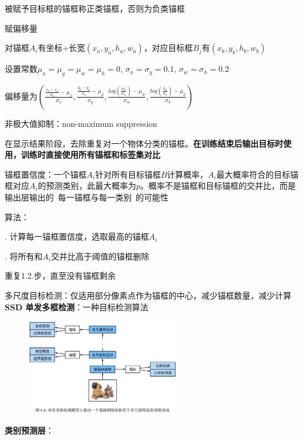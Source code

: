 \documentclass[UTF8]{ctexart}
\begin{document}
  \quad \quad 被赋予目标框的锚框称正类锚框，否则为负类锚框

  \quad 赋偏移量

  \quad \quad 对锚框$A_i$有坐标+长宽$(x_a, y_a, h_a, w_a)$，对应目标框$B_j$有$(x_b, y_b, h_b, w_b)$

  \quad \quad 设置常数$\mu_x = \mu_y = \mu_w = \mu_h = 0$, $\sigma_x = \sigma_y = 0.1$, $\sigma_w = \sigma_h = 0.2$

  \quad \quad 偏移量为$(\frac{\frac{x_b - x_a}{w_a} - \mu_x}{\sigma_x},\frac{\frac{y_b - y_a}{h_a} - \mu_y}{\sigma_y}, \frac{log(\frac{w_b}{w_a}) - \mu_w}{\sigma_w}, \frac{log(\frac{h_b}{h_a}) - \mu_h}{\sigma_h})$

  非极大值抑制：non-maximum suppression

  \quad 在显示结果阶段，去除重复对一个物体分类的锚框。\textbf{在训练结束后输出目标时使用，训练时直接使用所有锚框和标签集对比}

  \quad 锚框置信度：一个锚框$A_i$针对所有目标锚框$B$计算概率，$A_i$最大概率符合的目标锚框对应$A_i$的预测类别，此最大概率为$p$。概率不是锚框和目标锚框的交并比，而是输出层输出的\ 每一锚框与每一类别\ 的可能性

  \quad 算法：

  \quad {}. 计算每一锚框置信度，选取最高的锚框$A_i$

  \quad {}. 将所有和$A_i$交并比高于阈值的锚框删除

  \quad \quad 重复1.2.步，直至没有锚框剩余

  多尺度目标检测：仅适用部分像素点作为锚框的中心，减少锚框数量，减少计算\\
\textbf{SSD 单发多框检测}：一种目标检测算法

  \begin{figure}[H] %
    \centering %
    \includegraphics[width=0.6\textwidth]{note_images/SSD_archi.png} %
  \end{figure}

  \textbf{类别预测层}：
\end{document}
